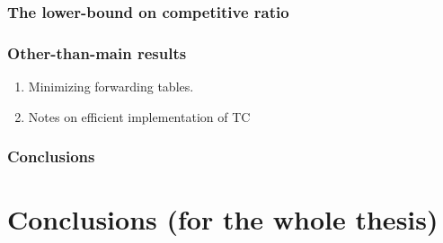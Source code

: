 \documentclass[a4paper]{article}
\begin{document}
\subsubsection{The lower-bound on competitive ratio}

\subsubsection{Other-than-main results}
\begin{enumerate}
  \item Minimizing forwarding tables.
  \item Notes on efficient implementation of TC
\end{enumerate}
\subsubsection{Conclusions}


\section{Conclusions (for the whole thesis)}
\end{document}
